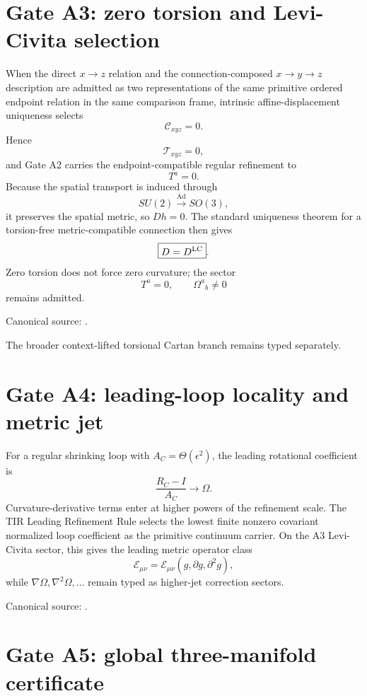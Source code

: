 \section{Gate A3: zero torsion and Levi-Civita selection}

When the direct \(x\to z\) relation and the connection-composed
\(x\to y\to z\) description are admitted as two representations of the same
primitive ordered endpoint relation in the same comparison frame, intrinsic
affine-displacement uniqueness selects
\[
\boxed{\mathcal C_{xyz}=0}.
\]
Hence
\[
\mathcal T_{xyz}=0,
\]
and Gate A2 carries the endpoint-compatible regular refinement to
\[
\boxed{T^a=0}.
\]
Because the spatial transport is induced through
\[
SU(2)\xrightarrow{\operatorname{Ad}}SO(3),
\]
it preserves the spatial metric, so \(Dh=0\).  The standard uniqueness theorem
for a torsion-free metric-compatible connection then gives
\[
\boxed{D=D^{\rm LC}}.
\]
Zero torsion does not force zero curvature; the sector
\[
T^a=0,
\qquad
\Omega^a{}_b\ne0
\]
remains admitted.

Canonical source:
.

The broader context-lifted torsional Cartan branch remains typed separately.

\section{Gate A4: leading-loop locality and metric jet}

For a regular shrinking loop with \(A_C=\Theta(\epsilon^2)\), the leading
rotational coefficient is
\[
\boxed{
\frac{R_C-I}{A_C}\longrightarrow\Omega.
}
\]
Curvature-derivative terms enter at higher powers of the refinement scale.
The TIR Leading Refinement Rule selects the lowest finite nonzero covariant
normalized loop coefficient as the primitive continuum carrier.  On the A3
Levi-Civita sector, this gives the leading metric operator class
\[
\boxed{
\mathcal E_{\mu\nu}
=\mathcal E_{\mu\nu}(g,\partial g,\partial^2g),
}
\]
while \(\nabla\Omega,\nabla^2\Omega,\ldots\) remain typed as higher-jet
correction sectors.

Canonical source:
.

\section{Gate A5: global three-manifold certificate}

